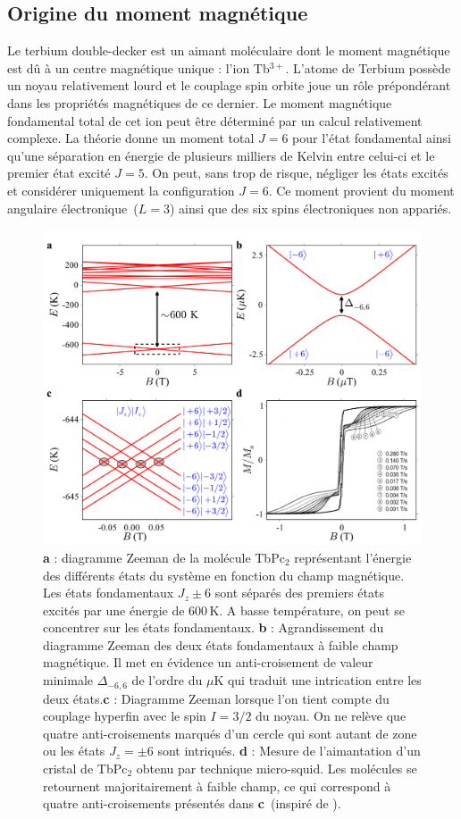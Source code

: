 \subsection{Origine du moment magnétique}
Le terbium double-decker est un aimant moléculaire dont le moment magnétique est d\^u à un centre magnétique unique : l'ion Tb$^{3+}$. L'atome de Terbium possède un noyau relativement lourd et le couplage spin orbite joue un r\^ole prépondérant dans les propriétés magnétiques de ce dernier. Le moment magnétique fondamental total de cet ion peut \^etre déterminé par un calcul relativement complexe. La théorie donne un moment total $J=6$ pour l'état fondamental ainsi qu'une séparation en énergie de plusieurs milliers de Kelvin entre celui-ci et le premier état excité $J=5$. On peut, sans trop de risque, négliger les états excités et considérer uniquement la configuration $J=6$. Ce moment provient du moment angulaire électronique~($L=3$) ainsi que des six spins électroniques non appariés. 

\begin{figure}
\centering \includegraphics[scale=0.5]{Theorie/MagMol/figure4/figure4.pdf} 
\caption{\textbf{a} : diagramme Zeeman de la molécule TbPc$_2$ représentant l'énergie des différents états du système en fonction du champ magnétique. Les états fondamentaux $J_z \pm 6$ sont séparés des premiers états excités par une énergie de $600$\,K. A basse température, on peut se concentrer sur les états fondamentaux. \textbf{b} : Agrandissement du diagramme Zeeman des deux états fondamentaux à faible champ magnétique. Il met en évidence un anti-croisement de valeur minimale $\Delta_{-6,6}$ de l'ordre du $\mu$K qui traduit une intrication entre les deux états.\textbf{c} : Diagramme Zeeman lorsque l'on tient compte du couplage hyperfin avec le spin $I=3/2$ du noyau. On ne relève que quatre anti-croisements marqués d'un cercle qui sont autant de zone ou les états $J_z =\pm6$ sont intriqués. \textbf{d} : Mesure de l'aimantation d'un cristal de TbPc$_2$ obtenu par technique micro-squid. Les molécules se retournent majoritairement à faible champ, ce qui correspond à quatre anti-croisements présentés dans \textbf{c}~(inspiré de \cite{Ishikawa2005}).}
\label{TbPc2Zeeman}
\end{figure}

